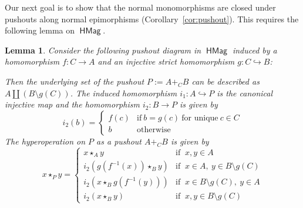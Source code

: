 \documentclass[reqno]{amsart}
\newcommand{\cat}[1]{\ensuremath{\mathsf{#1}}}
\DeclareMathOperator{\HMag}{\cat{HMag}}
\numberwithin{equation}{section}
\theoremstyle{plain}
\newtheorem{lemma}[equation]{Lemma}
\theoremstyle{definition}
\begin{document}
Our next goal is to show that the normal monomorphisms are closed under pushouts along normal epimorphisms (Corollary~\ref{cor:pushout}). This requires the following lemma on $\HMag$.

\begin{lemma}\label{HML}
Consider the following pushout diagram in $\HMag$ induced by a homomorphism $f \colon C\rightarrow A$ and an injective strict homomorphism $g \colon C\hookrightarrow B$:
\begin{center}
\end{center}
Then the underlying set of the pushout $P:=A+_CB$ can be described as $A\coprod (B\setminus g(C))$. The induced homomorphism
$i_1:A\hookrightarrow P$ is the canonical injective map and the homomorphism $i_2:B\rightarrow P$ is given by
$$i_2(b)=\left\{\begin{array}{llll}
f(c) & \text{if}\ b=g(c)\ \text{for unique}\ c\in C\\
b & \text{otherwise}
\end{array}\right.$$
The hyperoperation on $P$ as a pushout $A+_CB$ is given by
$$x\star_P y=\left\{\begin{array}{llll}
x\star_Ay & \text{if }\ x, y\in A\\
i_2(g(f^{-1}(x))\star_By) & \text{if }\ x\in A,\ y\in B\setminus g(C)\\
i_2(x\star_Bg(f^{-1}(y))) & \text{if }\ x\in B\setminus g(C),\ y\in A\\
i_2(x\star_By) & \text{if }\ x, y\in B\setminus g(C)
\end{array}\right.$$
\end{lemma}
\end{document}
